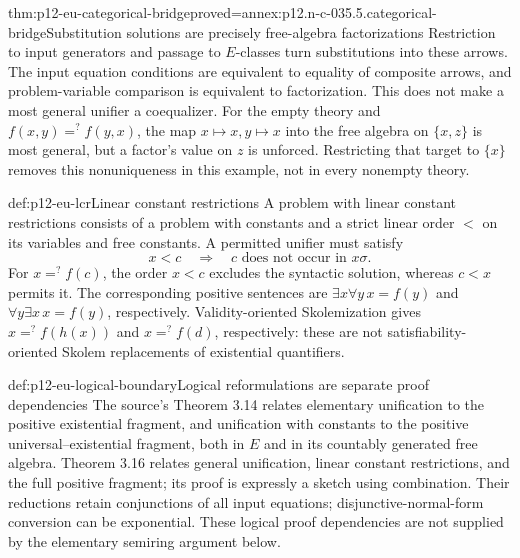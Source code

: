 \begin{hbtheorem}{thm:p12-eu-categorical-bridge}{proved=annex:p12.n-c-035.5.categorical-bridge}{Substitution solutions are precisely free-algebra factorizations}
Restriction to input generators and passage to \(E\)-classes turn
substitutions into these arrows. The input equation conditions are
equivalent to equality of composite arrows, and problem-variable
comparison is equivalent to factorization. This does not make a most
general unifier a coequalizer. For the empty theory and
\(f(x,y)=^{?}f(y,x)\), the map \(x\mapsto x,y\mapsto x\) into
the free algebra on \(\{x,z\}\) is most general, but a factor's
value on \(z\) is unforced. Restricting that target to \(\{x\}\)
removes this nonuniqueness in this example, not in every nonempty theory.
\end{hbtheorem}

\begin{hbdefinition}{def:p12-eu-lcr}{Linear constant restrictions}
A problem with linear constant restrictions consists of a problem with
constants and a strict linear order \(<\) on its variables and free
constants. A permitted unifier must satisfy
\[
          x<c\quad\Longrightarrow\quad c\text{ does not occur in }x\sigma.
\]
For \(x=^{?}f(c)\), the order \(x<c\) excludes the syntactic solution,
whereas \(c<x\) permits it. The corresponding positive sentences are
\(\exists x\forall y\,x=f(y)\) and
\(\forall y\exists x\,x=f(y)\), respectively. Validity-oriented
Skolemization gives \(x=^{?}f(h(x))\) and \(x=^{?}f(d)\),
respectively: these are not satisfiability-oriented Skolem replacements
of existential quantifiers. \cite[Definition 3.15 and example, pp.~479--480]{BaaderSnyder2001}
\end{hbdefinition}

\begin{proofboundary}{def:p12-eu-logical-boundary}{Logical reformulations are separate proof dependencies}
The source's Theorem 3.14 relates elementary unification to the positive
existential fragment, and unification with constants to the positive
universal--existential fragment, both in \(E\) and in its countably
generated free algebra. Theorem 3.16 relates general unification, linear
constant restrictions, and the full positive fragment; its proof is
expressly a sketch using combination. Their reductions retain conjunctions
of all input equations; disjunctive-normal-form conversion can be
exponential. These logical proof dependencies are not supplied by the
elementary semiring argument below.
\cite[Theorems 3.14 and 3.16, pp.~478--480]{BaaderSnyder2001}
\end{proofboundary}

